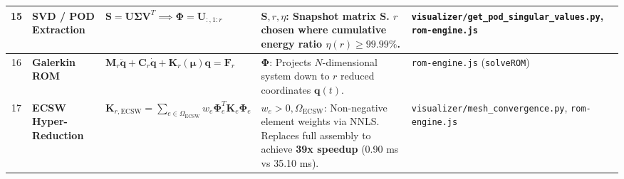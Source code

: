 \begin{landscape}
\begin{center}
\begin{longtable}{|c|p{3.5cm}|p{6cm}|p{6cm}|p{6cm}|}
15 & \textbf{SVD / POD Extraction} & $\mathbf{S} = \mathbf{U} \boldsymbol{\Sigma} \mathbf{V}^T \implies \boldsymbol{\Phi} = \mathbf{U}_{:, 1:r}$ & $\mathbf{S}, r, \eta$: Snapshot matrix $\mathbf{S}$. $r$ chosen where cumulative energy ratio $\eta(r) \ge 99.99\%$. & \texttt{visualizer/get\_pod\_singular\_values.py}, \texttt{rom-engine.js} \\
\hline

16 & \textbf{Galerkin ROM} & $\mathbf{M}_r \ddot{\mathbf{q}} + \mathbf{C}_r \dot{\mathbf{q}} + \mathbf{K}_r(\boldsymbol{\mu}) \mathbf{q} = \mathbf{F}_r$ & $\boldsymbol{\Phi}$: Projects $N$-dimensional system down to $r$ reduced coordinates $\mathbf{q}(t)$. & \texttt{rom-engine.js} (\texttt{solveROM}) \\
\hline

17 & \textbf{ECSW Hyper-Reduction} & $\mathbf{K}_{r,\text{ECSW}} = \sum_{e \in \Omega_{\text{ECSW}}} w_e \boldsymbol{\Phi}_e^T \mathbf{K}_e \boldsymbol{\Phi}_e$ & $w_e > 0, \Omega_{\text{ECSW}}$: Non-negative element weights via NNLS. Replaces full assembly to achieve \textbf{39x speedup} (0.90 ms vs 35.10 ms). & \texttt{visualizer/mesh\_convergence.py}, \texttt{rom-engine.js} \\
\hline
\end{longtable}
\end{center}
\end{landscape}
